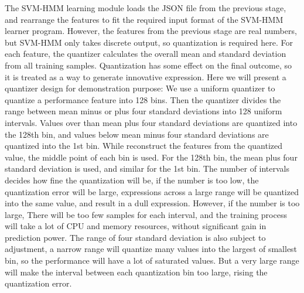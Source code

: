 The SVM-HMM learning module loads the JSON file from the previous stage, and rearrange the features to fit the required input format of the SVM-HMM learner program. However, the features from the previous stage are real numbers, but SVM-HMM only takes discrete output, so quantization is required here. For each feature, the quantizer calculates the overall mean and standard deviation from all training samples. Quantization has some effect on the final outcome, so it is treated as a way to generate innovative expression. Here we will present a quantizer design for demonstration purpose: We use a uniform quantizer to quantize a performance feature into 128 bins. Then the quantizer divides the range between mean minus or plus four standard deviations into 128 uniform intervals. Values over than mean plus four standard deviations are quantized into the 128th bin, and values below mean minus four standard deviations are quantized into the 1st bin. While reconstruct the features from the quantized value, the middle point of each bin is used. For the 128th bin, the mean plus four standard deviation is used, and similar for the 1st bin. The number of intervals decides how fine the quantization will be, if the number is too low, the quantization error will be large, expressions across a large range will be quantized into the same value, and result in a dull expression. However, if the number is too large, There will be too few samples for each interval, and the training process will take a lot of CPU and memory resources, without significant gain in prediction power. The range of four standard deviation is also subject to adjustment, a narrow range will quantize many values into the largest of smallest bin, so the performance will have a lot of saturated values. But a very large range will make the interval between each quantization bin too large, rising the quantization error. %

